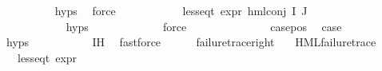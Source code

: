 \begin{isabellebody}
\ \ \ \ \ \ \ \ \isamarkupfalse%
\ {\isachardoublequoteopen}{}{\isachardot}{\kern0pt}hyps{\isachardoublequoteclose}\ \isamarkupfalse%
\ force\isanewline
\isanewline
\ \ \ \ \ \ \ \ \isamarkupfalse%
\ \isamarkupfalse%
\ {\isachardoublequoteopen}less{\isacharunderscore}{\kern0pt}eq{\isacharunderscore}{\kern0pt}t\ {\isacharparenleft}{\kern0pt}expr\ {\isacharparenleft}{\kern0pt}hml{\isacharunderscore}{\kern0pt}conj\ I\ J\ {\isasymPhi}{\isacharparenright}{\kern0pt}{\isacharparenright}{\kern0pt}\ {\isacharparenleft}{\kern0pt}{}{\isacharcomma}{\kern0pt}\ {\isasyminfinity}{\isacharcomma}{\kern0pt}\ {}{\isacharcomma}{\kern0pt}\ {}{\isacharcomma}{\kern0pt}\ {}{\isacharcomma}{\kern0pt}\ {}{\isacharparenright}{\kern0pt}{\isachardoublequoteclose}\isanewline
\ \ \ \ \ \ \ \ \ \ \isamarkupfalse%
\ {\isachardoublequoteopen}{}{\isachardot}{\kern0pt}hyps{\isachardoublequoteclose}\ \isanewline
\ \ \ \ \ \ \ \ \ \ \isamarkupfalse%
\ force\isanewline
\ \ \ \ \ \ \isamarkupfalse%
\isanewline
\ \ \ \ \ \ \isamarkupfalse%
\ case{\isacharunderscore}{\kern0pt}pos\ \isamarkupfalse%
\ {\isacharquery}{\kern0pt}case\isanewline
\ \ \ \ \ \ \ \ \isamarkupfalse%
\ {\isachardoublequoteopen}{}{\isachardot}{\kern0pt}hyps{\isachardoublequoteclose}\ \isanewline
\ \ \ \ \ \ \ \ \isamarkupfalse%
\ {\isachardoublequoteopen}{}{\isachardot}{\kern0pt}IH{\isachardoublequoteclose}\ \isamarkupfalse%
\ fastforce\isanewline
\ \ \ \ \isamarkupfalse%
%
\endisatagproof
{\isafoldproof}%
%
\isadelimproof
\isanewline
%
\endisadelimproof
\isanewline
{}\isamarkupfalse%
\ failure{\isacharunderscore}{\kern0pt}trace{\isacharunderscore}{\kern0pt}right{\isacharcolon}{\kern0pt}\isanewline
\ \ \ {\isachardoublequoteopen}{\isacharparenleft}{\kern0pt}HML{\isacharunderscore}{\kern0pt}failure{\isacharunderscore}{\kern0pt}trace\ {\isasymphi}{\isacharparenright}{\kern0pt}{\isachardoublequoteclose}\isanewline
\ \ \ {\isachardoublequoteopen}{\isacharparenleft}{\kern0pt}less{\isacharunderscore}{\kern0pt}eq{\isacharunderscore}{\kern0pt}t\ {\isacharparenleft}{\kern0pt}expr\ {\isasymphi}{\isacharparenright}{\kern0pt}\ {\isacharparenleft}{\kern0pt}{\isasyminfinity}{\isacharcomma}{\kern0pt}\ {\isasyminfinity}{\isacharcomma}{\kern0pt}\ {\isasyminfinity}{\isacharcomma}{\kern0pt}\ {}{\isacharcomma}{\kern0pt}\ {}{\isacharcomma}{\kern0pt}\ {}{\isacharparenright}{\kern0pt}{\isacharparenright}{\kern0pt}{\isachardoublequoteclose}\isanewline

\end{isabellebody}
